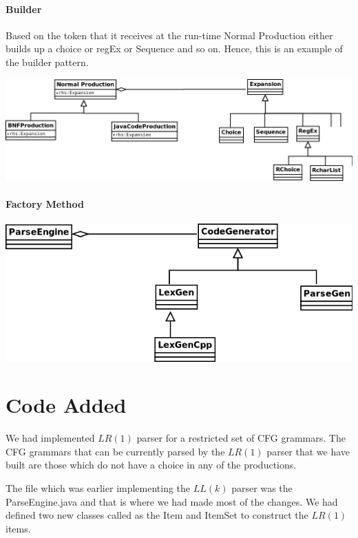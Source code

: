 \documentclass[oneside]{book}
\begin{document}
\subsubsection*{Builder} 

Based on the token that it receives at the run-time Normal Production either builds up a choice or regEx or Sequence and so on. Hence, this is an example of the builder pattern.
\begin{center}
\includegraphics[scale=0.4]{AbstractFactory1.png}
\end{center} 

\subsubsection*{Factory Method}
\begin{center}
\includegraphics[scale=0.5]{FactoryMethod1.png}
\end{center}

\chapter{Code Added}
We had implemented $LR(1)$ parser for a restricted set of CFG grammars. The CFG grammars that can be currently parsed by the $LR(1)$ parser that we have built are those which do not have a choice in any of the productions.

The file which was earlier implementing the $LL(k)$ parser was the ParseEngine.java and that is where we had made most of the changes. We had defined two new classes called as the Item and ItemSet to construct the $LR(1)$ items.\\
\end{document}
